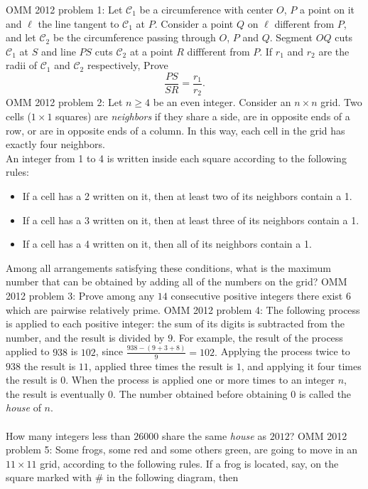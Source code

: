 OMM 2012 problem 1:  Let $\mathcal{C}_1$ be a circumference with center $O$, $P$ a point on it and $\ell$ the line tangent to $\mathcal{C}_1$ at $P$. Consider a point $Q$ on $\ell$ different from $P$, and let $\mathcal{C}_2$ be the circumference passing through $O$, $P$ and $Q$. Segment $OQ$ cuts $\mathcal{C}_1$ at $S$ and line $PS$ cuts $\mathcal{C}_2$ at a point $R$ diffferent from $P$. If $r_1$ and $r_2$ are the radii of $\mathcal{C}_1$ and $\mathcal{C}_2$ respectively, Prove
\[ \frac{PS}{SR} = \frac{r_1}{r_2}. \] 
OMM 2012 problem 2:  Let $n \geq 4$ be an even integer. Consider an $n \times n$ grid. Two cells ($1 \times 1$ squares) are \textit{neighbors} if they share a side, are in opposite ends of a row, or are in opposite ends of a column. In this way, each cell in the grid has exactly four neighbors. \\
An integer from 1 to 4 is written inside each square according to the following rules:
\begin{itemize}
  \item If a cell has a 2 written on it, then at least two of its neighbors contain a 1.
  \item If a cell has a 3 written on it, then at least three of its neighbors contain a 1.
  \item If a cell has a 4 written on it, then all of its neighbors contain a 1.
\end{itemize}
Among all arrangements satisfying these conditions, what is the maximum number that can be obtained by adding all of the numbers on the grid? 
OMM 2012 problem 3:  Prove among any $14$ consecutive positive integers there exist $6$ which are pairwise relatively prime. 
OMM 2012 problem 4:  The following process is applied to each positive integer: the sum of its digits is subtracted from the number, and the result is divided by $9$. For example, the result of the process applied to $938$ is $102$, since $\frac{938-(9 + 3 + 8)}{9} = 102.$ Applying the process twice to $938$ the result is $11$, applied three times the result is $1$, and applying it four times the result is $0$. When the process is applied one or more times to an integer $n$, the result is eventually $0$. The number obtained before obtaining $0$ is called the \textit{house} of $n$. \\\\
How many integers less than $26000$ share the same \textit{house} as $2012$? 
OMM 2012 problem 5:  Some frogs, some red and some others green, are going to move in an $11 \times 11$ grid, according to the following rules. If a frog is located, say, on the square marked with # in the following diagram, then
